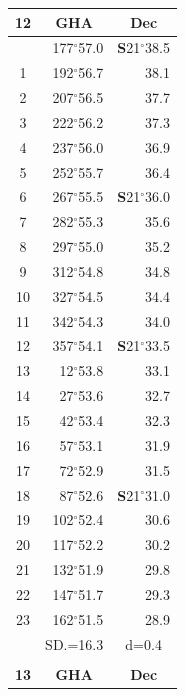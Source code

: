\documentclass[10pt, a4paper]{report}
\begin{document}
\begin{scriptsize}
\noindent
\begin{tabular*}{0.2\textwidth}[t]{@{\extracolsep{\fill}}|c|rr|}
\hline
\multicolumn{1}{|c|}{\rule{0pt}{2.6ex}\textbf{12}} & \multicolumn{1}{c}{\textbf{GHA}} & \multicolumn{1}{c|}{\textbf{Dec}}\\
\hline\rule{0pt}{2.6ex}\noindent
0 & 177$^\circ$57.0 & \textbf{S}21$^\circ$38.5\\
1 & 192$^\circ$56.7 & 38.1\\
2 & 207$^\circ$56.5 & 37.7\\
3 & 222$^\circ$56.2 & \raisebox{0.24ex}{\boldmath$\cdot$~\boldmath$\cdot$~~}37.3\\
4 & 237$^\circ$56.0 & 36.9\\
5 & 252$^\circ$55.7 & 36.4\\[2Pt]
6 & 267$^\circ$55.5 & \textbf{S}21$^\circ$36.0\\
7 & 282$^\circ$55.3 & 35.6\\
8 & 297$^\circ$55.0 & 35.2\\
9 & 312$^\circ$54.8 & \raisebox{0.24ex}{\boldmath$\cdot$~\boldmath$\cdot$~~}34.8\\
10 & 327$^\circ$54.5 & 34.4\\
11 & 342$^\circ$54.3 & 34.0\\[2Pt]
12 & 357$^\circ$54.1 & \textbf{S}21$^\circ$33.5\\
13 & 12$^\circ$53.8 & 33.1\\
14 & 27$^\circ$53.6 & 32.7\\
15 & 42$^\circ$53.4 & \raisebox{0.24ex}{\boldmath$\cdot$~\boldmath$\cdot$~~}32.3\\
16 & 57$^\circ$53.1 & 31.9\\
17 & 72$^\circ$52.9 & 31.5\\[2Pt]
18 & 87$^\circ$52.6 & \textbf{S}21$^\circ$31.0\\
19 & 102$^\circ$52.4 & 30.6\\
20 & 117$^\circ$52.2 & 30.2\\
21 & 132$^\circ$51.9 & \raisebox{0.24ex}{\boldmath$\cdot$~\boldmath$\cdot$~~}29.8\\
22 & 147$^\circ$51.7 & 29.3\\
23 & 162$^\circ$51.5 & 28.9\\
\hline
\rule{0pt}{2.4ex} & \multicolumn{1}{c}{SD.=16.3} & \multicolumn{1}{c|}{d=0.4}\\
\hline
\multicolumn{1}{c}{}\\[-0.5ex]\hline
\multicolumn{1}{|c|}{\rule{0pt}{2.6ex}\textbf{13}} & \multicolumn{1}{c}{\textbf{GHA}} & \multicolumn{1}{c|}{\textbf{Dec}}\\

\end{tabular*}
\end{scriptsize}
\end{document}
